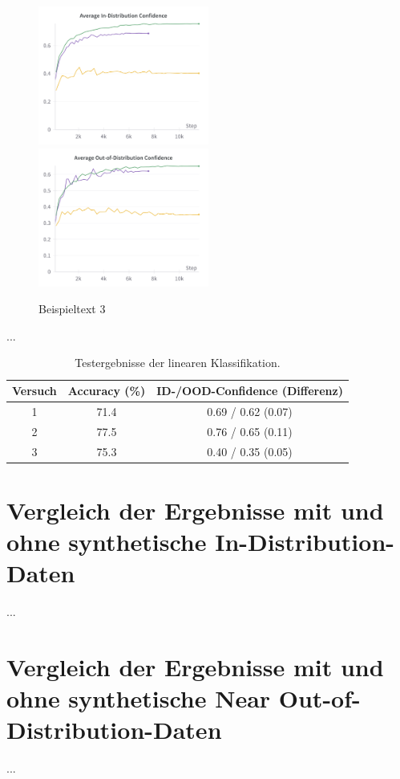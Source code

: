 \begin{figure}
	\centering
	\includegraphics[width=0.5\textwidth]{figure_results_supcon-lin_avg-id-conf.png}%
	\includegraphics[width=0.5\textwidth]{figure_results_supcon-lin_avg-ood-conf.png}
	\caption{Beispieltext 3}
	\label{fig:supcon-lin-ood-detection}
\end{figure}

...

\begin{table}
	\caption{Testergebnisse der linearen Klassifikation.}
	\begin{tabular}{|c|c|c|}
		\hline
		\textbf{Versuch} & \textbf{Accuracy (\%)} & \textbf{ID-/OOD-Confidence (Differenz)} \\
		\hline
		1 & 71.4 & 0.69 / 0.62 (0.07) \\
		2 & 77.5 & 0.76 / 0.65 (0.11) \\
		3 & 75.3 & 0.40 / 0.35 (0.05) \\
		\hline
	\end{tabular}
	\label{tab:supcon-lin-results}
\end{table}

\section{Vergleich der Ergebnisse mit und ohne synthetische In-Distribution-Daten}

...

\section{Vergleich der Ergebnisse mit und ohne synthetische Near Out-of-Distribution-Daten}

...
